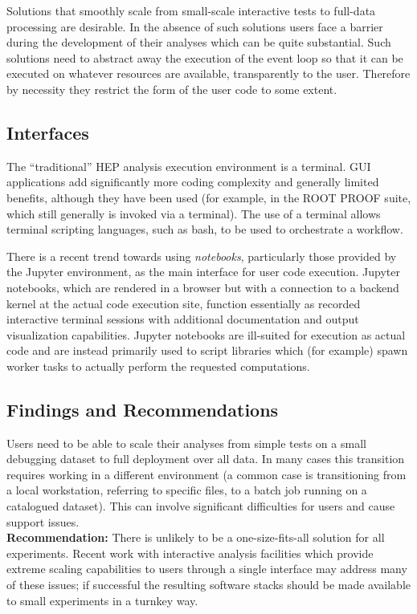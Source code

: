 Solutions that smoothly scale from small-scale interactive tests to full-data processing are desirable. In the absence of such solutions users face a barrier during the development of their analyses which can be quite substantial. Such solutions need to abstract away the execution of the event loop so that it can be executed on whatever resources are available, transparently to the user. Therefore by necessity they restrict the form of the user code to some extent. 


\subsection{Interfaces}

The ``traditional'' HEP analysis execution environment is a terminal. GUI applications add significantly more coding complexity and generally limited benefits, although they have been used (for example, in the ROOT PROOF suite, which still generally is invoked via a terminal). The use of a terminal allows terminal scripting languages, such as bash, to be used to orchestrate a workflow.

There is a recent trend towards using \textit{notebooks}, particularly those provided by the Jupyter environment, as the main interface for user code execution. Jupyter notebooks, which are rendered in a browser but with a connection to a backend kernel at the actual code execution site, function essentially as recorded interactive terminal sessions with additional documentation and output visualization capabilities. Jupyter notebooks are ill-suited for execution as actual code and are instead primarily used to script libraries which (for example) spawn worker tasks to actually perform the requested computations.

\subsection{Findings and Recommendations}
Users need to be able to scale their analyses from simple tests on a small debugging dataset to full deployment over all data. In many cases this transition requires working in a different environment (a common case is transitioning from a local workstation, referring to specific files, to a batch job running on a catalogued dataset). This can involve significant difficulties for users and cause support issues.\\
\textbf{Recommendation:} There is unlikely to be a one-size-fits-all solution for all experiments. Recent work with interactive analysis facilities which provide extreme scaling capabilities to users through a single interface may address many of these issues; if successful the resulting software stacks should be made available to small experiments in a turnkey way.


